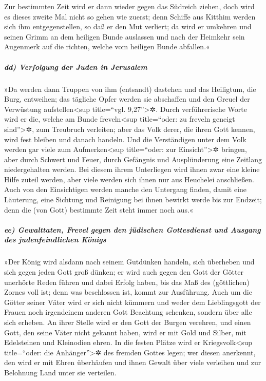 Zur bestimmten Zeit wird er dann wieder gegen das
Südreich ziehen, doch wird es dieses zweite Mal nicht so gehen wie
zuerst; denn Schiffe aus Kitthim werden sich ihm
entgegenstellen, so daß er den Mut verliert; da wird er umkehren und
seinen Grimm an dem heiligen Bunde auslassen und nach der Heimkehr sein
Augenmerk auf die richten, welche vom heiligen Bunde abfallen.«

\hypertarget{dd-verfolgung-der-juden-in-jerusalem}{%
\subparagraph{dd) Verfolgung der Juden in
Jerusalem}\label{dd-verfolgung-der-juden-in-jerusalem}}

»Da werden dann Truppen von ihm (entsandt) dastehen und
das Heiligtum, die Burg, entweihen; das tägliche Opfer werden sie
abschaffen und den Greuel der Verwüstung aufstellen\textless sup
title=``vgl. 9,27''\textgreater✲. Durch verführerische
Worte wird er die, welche am Bunde freveln\textless sup title=``oder: zu
freveln geneigt sind''\textgreater✲, zum Treubruch verleiten; aber das
Volk derer, die ihren Gott kennen, wird fest bleiben und danach handeln.
Und die Verständigen unter dem Volk werden gar viele zum
Aufmerken\textless sup title=``oder: zur Einsicht''\textgreater✲
bringen, aber durch Schwert und Feuer, durch Gefängnis und Ausplünderung
eine Zeitlang niedergehalten werden. Bei diesem ihrem
Unterliegen wird ihnen zwar eine kleine Hilfe zuteil werden, aber viele
werden sich ihnen nur aus Heuchelei anschließen. Auch von
den Einsichtigen werden manche den Untergang finden, damit eine
Läuterung, eine Sichtung und Reinigung bei ihnen bewirkt werde bis zur
Endzeit; denn die (von Gott) bestimmte Zeit steht immer noch aus.«

\hypertarget{ee-gewalttaten-frevel-gegen-den-juxfcdischen-gottesdienst-und-ausgang-des-judenfeindlichen-kuxf6nigs}{%
\subparagraph{ee) Gewalttaten, Frevel gegen den jüdischen Gottesdienst
und Ausgang des judenfeindlichen
Königs}\label{ee-gewalttaten-frevel-gegen-den-juxfcdischen-gottesdienst-und-ausgang-des-judenfeindlichen-kuxf6nigs}}

»Der König wird alsdann nach seinem Gutdünken handeln,
sich überheben und sich gegen jeden Gott groß dünken; er wird auch gegen
den Gott der Götter unerhörte Reden führen und dabei Erfolg haben, bis
das Maß des (göttlichen) Zornes voll ist; denn was beschlossen ist,
kommt zur Ausführung. Auch um die Götter seiner Väter
wird er sich nicht kümmern und weder dem Lieblingsgott der Frauen noch
irgendeinem anderen Gott Beachtung schenken, sondern über alle sich
erheben. An ihrer Stelle wird er den Gott der Burgen
verehren, und einen Gott, den seine Väter nicht gekannt haben, wird er
mit Gold und Silber, mit Edelsteinen und Kleinodien ehren.
In die festen Plätze wird er Kriegsvolk\textless sup
title=``oder: die Anhänger''\textgreater✲ des fremden Gottes legen; wer
diesen anerkennt, den wird er mit Ehren überhäufen und ihnen Gewalt über
viele verleihen und zur Belohnung Land unter sie verteilen.

